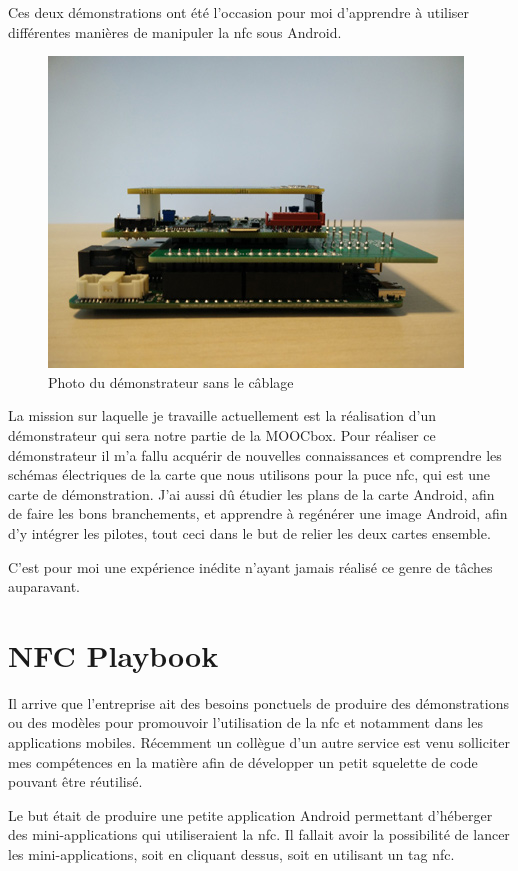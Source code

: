 \documentclass[french,12pt,a4paper,titlepage,openright,openbib]{report}
\begin{document}
Ces deux démonstrations ont été l'occasion pour moi d'apprendre à utiliser différentes manières de manipuler la \gls{nfc} sous Android.
\begin{figure}
	\center
	\includegraphics[]{demonstrateur}
	\caption{Photo du démonstrateur sans le câblage}
\end{figure}
La mission sur laquelle je travaille actuellement est la réalisation d'un démonstrateur qui sera notre partie de la MOOCbox.
Pour réaliser ce démonstrateur il m'a fallu acquérir de nouvelles connaissances et comprendre les schémas électriques de la carte que nous utilisons pour la puce \gls{nfc}, qui est une carte de démonstration. J'ai aussi dû étudier les plans de la carte Android, afin de faire les bons branchements, et apprendre à regénérer une image Android, afin d’y intégrer les pilotes, tout ceci dans le but de relier les deux cartes ensemble.

C'est pour moi une expérience inédite n'ayant jamais réalisé ce genre de tâches auparavant.

\section{NFC Playbook}
Il arrive que l'entreprise ait des besoins ponctuels de produire des démonstrations ou des modèles pour promouvoir l'utilisation de la \gls{nfc} et notamment dans les applications mobiles.
Récemment un collègue d'un autre service est venu solliciter mes compétences en la matière afin de développer un petit squelette de code pouvant être réutilisé.

Le but était de produire une petite application Android permettant d'héberger des mini-applications qui utiliseraient la \gls{nfc}. Il fallait avoir la possibilité de lancer les mini-applications, soit en cliquant dessus, soit en utilisant un tag \gls{nfc}.
\end{document}
